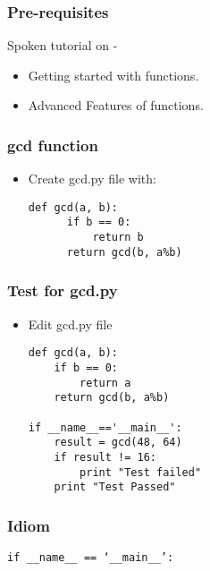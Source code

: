 \documentclass[17pt,compress]{beamer}
\begin{document}
\begin{frame}
\frametitle{Pre-requisites}
\label{sec-3}

Spoken tutorial on -

\begin{itemize}
\item Getting started with functions.\pause
\item Advanced Features of functions.
\end{itemize}
\end{frame}
\begin{frame}[fragile]
\frametitle{gcd function}
\label{sec-4}

\begin{itemize}
\item Create gcd.py file with:
\begin{small}
\lstset{language=Python}
\begin{lstlisting}
def gcd(a, b):
      if b == 0: 
          return b
      return gcd(b, a%b)
\end{lstlisting}
\end{small}
\end{itemize}
\end{frame}
\begin{frame}[fragile]
\frametitle{Test for gcd.py}
\label{sec-5}

\begin{itemize}
\item Edit gcd.py file
\lstset{language=Python}
\begin{small}
\begin{lstlisting}
def gcd(a, b):
    if b == 0:
        return a
    return gcd(b, a%b)

if __name__=='__main__':
    result = gcd(48, 64)
    if result != 16:
        print "Test failed"
    print "Test Passed"
\end{lstlisting}
\end{small}
\end{itemize}
\end{frame}
\begin{frame}
\frametitle{Idiom}
\label{sec-6}

\texttt{if \_\_name\_\_ == `\_\_main\_\_':}
\end{frame}
\end{document}
